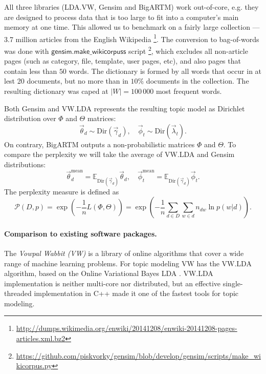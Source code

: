 \documentclass{llncs}
\newcommand{\kw}[1]{\textsf{#1}}
\begin{document}
All three libraries (LDA.VW, Gensim and BigARTM) work out-of-core,
e.g. they are designed to process data that is too large to fit into a computer's main memory at one time.
This allowed us to benchmark on a fairly large collection --- 3.7 million articles from the English Wikipedia
\footnote{\url{http://dumps.wikimedia.org/enwiki/20141208/enwiki-20141208-pages-articles.xml.bz2}}.
The conversion to bag-of-words was done with $\kw{gensim.make\_wikicorpuss}$ script
\footnote{\url{https://github.com/piskvorky/gensim/blob/develop/gensim/scripts/make_wikicorpus.py}},
which excludes all non-article pages (such as category, file, template, user pages, etc),
and also pages that contain less than $50$ words.
The dictionary is formed by all words that occur in at lest 20 documents,
but no more than in $10\%$ documents in the collection.
The resulting dictionary was caped at $|W| = 100\,000$ most frequent words.

Both Gensim and VW.LDA represents the resulting topic model as Dirichlet distribution over $\Phi$ and $\Theta$ matrices:
\[
	\vec{\theta}_{d} \sim \text{Dir}(\vec{\gamma}_d), \quad \vec{\phi}_{t} \sim \text{Dir}(\vec{\lambda}_t).
\]
On contrary, BigARTM outputs a non-probabilistic matrices $\Phi$ and $\Theta$.
To compare the perplexity we will take the average of VW.LDA and Gensim distributions:
\[
	\vec{\theta}^\text{mean}_d = \mathbb{E}_{\text{Dir}(\vec{\gamma}_d)}\vec{\theta}_d, \quad \vec{\phi}^\text{mean}_t = \mathbb{E}_{\text{Dir}(\vec{\gamma}_d)} \vec{\phi}_t.
\]
The perplexity measure is defined as
\begin{equation}
    \label{eq:perplexity}
    \mathscr{P}(D, p) = \exp\left(- \frac{1}{n} L(\Phi, \Theta) \right) = \exp \left( - \frac{1}{n} \sum_{d \in D} \sum_{w \in d} n_{dw} \ln p(w | d) \right).
\end{equation}

\paragraph{Comparison to existing software packages.}

The \emph{Vowpal Wabbit (VW)} is a library
of online algorithms that cover a wide range of machine learning problems. %
For topic modeling VW has the VW.LDA algorithm, based on the Online Variational Bayes LDA \cite{hoffman10online}.
VW.LDA implementation is neither multi-core nor distributed,
but an effective single-threaded implementation in C++ made it one of the fastest tools for topic modeling.%
\end{document}
